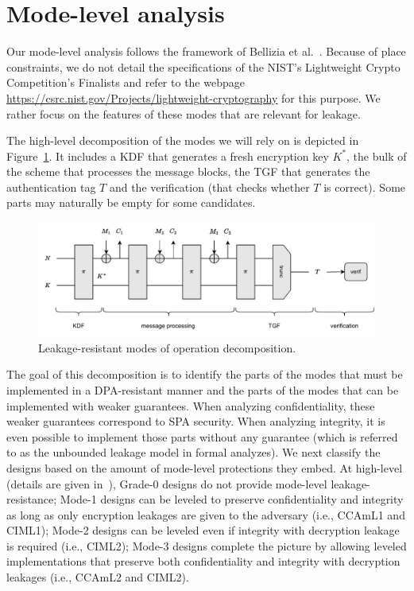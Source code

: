 \documentclass{llncs}
\begin{document}
\section{Mode-level analysis}\label{sec:modes}

Our mode-level analysis follows the framework of Bellizia et al.~\cite{DBLP:conf/crypto/BelliziaBCGGMPP20}.
Because of place constraints, we do not detail the specifications of the NIST's
Lightweight Crypto Competition's Finalists and refer to the webpage
\url{https://csrc.nist.gov/Projects/lightweight-cryptography} for this purpose.
We rather focus on the features of these modes that are relevant 
for leakage.

\medskip

The high-level decomposition of the modes we will rely on is depicted in Figure~\ref{fig:decomposition}.
It includes a KDF that generates a fresh encryption key $K^*$, the bulk of the scheme
that processes the message blocks, the TGF that generates the authentication tag $T$
and the verification (that checks whether $T$ is correct). Some parts may naturally be empty for some
candidates.

\begin{figure}
	\vspace*{-0.0cm}
	\hspace*{0.0cm}\centering \includegraphics[width=12.0cm]{figures/mode_decomposition.pdf}
	\vspace*{0.3cm}
	\caption{Leakage-resistant modes of operation decomposition.}\label{fig:decomposition}\vspace*{-0.0cm}
\end{figure}

\medskip

The goal of this decomposition is to identify the parts of the modes
that must be implemented in a DPA-resistant manner and the parts of the modes that 
can be implemented with weaker guarantees. When analyzing confidentiality,
these weaker guarantees correspond to SPA security.
When analyzing integrity,
it is even possible to implement those parts without
any guarantee (which is referred to as the unbounded leakage model in
formal analyzes). We next classify the designs based on the amount of 
mode-level protections they embed.
At high-level (details are given in~\cite{DBLP:conf/crypto/BelliziaBCGGMPP20}),
Grade-0 designs do not provide mode-level leakage-resistance; Mode-1 designs
can be leveled to preserve confidentiality and integrity as long as only encryption
leakages are given to the adversary (i.e., CCAmL1 and CIML1); Mode-2 designs
can be leveled even if integrity with decryption leakage is required (i.e., CIML2); Mode-3 designs
complete the picture by allowing leveled implementations that preserve both confidentiality
and integrity with decryption leakages (i.e., CCAmL2 and CIML2).  
\end{document}
